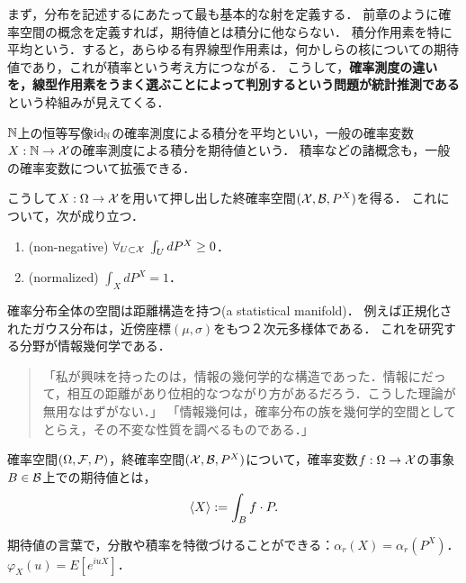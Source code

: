 \documentclass[uplatex,dvipdfmx]{jsreport}
\begin{document}
\begin{tcolorbox}[colframe=ForestGreen, colback=ForestGreen!10!white,breakable,colbacktitle=ForestGreen!40!white,coltitle=black,fonttitle=\bfseries\sffamily,
title=まさか，確率空間とは構造の入った多様体か．「観測」と「座標変換」の構造を持つ，極めて幾何的なsetupである．]
    まず，分布を記述するにあたって最も基本的な射を定義する．
    前章のように確率空間の概念を定義すれば，期待値とは積分に他ならない．
    積分作用素を特に平均という．すると，あらゆる有界線型作用素は，何かしらの核についての期待値であり，これが積率という考え方につながる．
    こうして，\textbf{確率測度の違いを，線型作用素をうまく選ぶことによって判別するという問題が統計推測である}という枠組みが見えてくる．

    $\mathbb{N}$上の恒等写像$\mathrm{id}_{\mathbb{N}}$の確率測度による積分を平均といい，一般の確率変数$X:\mathbb{N}\to\mathcal{X}$の確率測度による積分を期待値という．
    積率などの諸概念も，一般の確率変数について拡張できる．
\end{tcolorbox}

\begin{lemma}[確率分布の特徴付け]
    こうして$X:\Omega\to\mathcal{X}$を用いて押し出した終確率空間$(\mathcal{X},\mathcal{B},P^X)$を得る．
    これについて，次が成り立つ．
    \begin{enumerate}
        \item (non-negative) $\forall_{U\subset\mathcal{X}}\;\int_UdP^X\ge 0$．
        \item (normalized) $\int_XdP^X=1$．
    \end{enumerate}
\end{lemma}
\begin{remarks}
    確率分布全体の空間は距離構造を持つ(a statistical manifold)．
    例えば正規化されたガウス分布は，近傍座標$(\mu,\sigma)$をもつ２次元多様体である．
    これを研究する分野が情報幾何学である．
    \begin{quote}
        「私が興味を持ったのは，情報の幾何学的な構造であった．情報にだって，相互の距離があり位相的なつながり方があるだろう．こうした理論が無用なはずがない．」
        「情報幾何は，確率分布の族を幾何学的空間としてとらえ，その不変な性質を調べるものである．」
    \end{quote}
\end{remarks}

\begin{definition}
    確率空間$(\Omega,\mathcal{F},P)$，終確率空間$(\mathcal{X},\mathcal{B},P^X)$について，確率変数$f:\Omega\to\mathcal{X}$の事象$B\in\mathcal{B}$上での期待値とは，
    \[\langle X\rangle:=\int_Bf\cdot P.\]
\end{definition}
\begin{remark}
    期待値の言葉で，分散や積率を特徴づけることができる：$\alpha_r(X)=\alpha_r(P^X)$．
    $\varphi_X(u)=E[e^{iuX}]$．
\end{remark}
\end{document}
